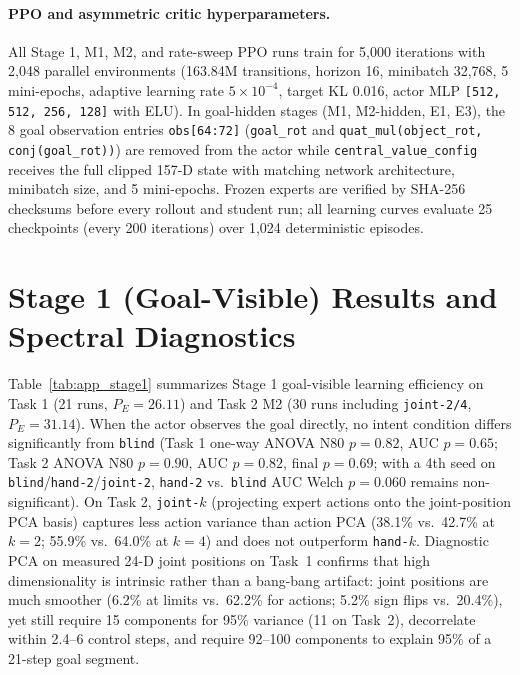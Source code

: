 \paragraph{PPO and asymmetric critic hyperparameters.}
All Stage 1, M1, M2, and rate-sweep PPO runs train for 5,000 iterations with 2,048 parallel environments (163.84M transitions, horizon 16, minibatch 32,768, 5 mini-epochs, adaptive learning rate $5\times 10^{-4}$, target KL 0.016, actor MLP \texttt{[512, 512, 256, 128]} with ELU).
In goal-hidden stages (M1, M2-hidden, E1, E3), the 8 goal observation entries \texttt{obs[64:72]} (\texttt{goal\_rot} and \texttt{quat\_mul(object\_rot, conj(goal\_rot))}) are removed from the actor while \texttt{central\_value\_config} receives the full clipped 157-D state with matching network architecture, minibatch size, and 5 mini-epochs.
Frozen experts are verified by SHA-256 checksums before every rollout and student run; all learning curves evaluate 25 checkpoints (every 200 iterations) over 1,024 deterministic episodes.

\section{Stage 1 (Goal-Visible) Results and Spectral Diagnostics}
\label{app:stage1}
Table~\ref{tab:app_stage1} summarizes Stage 1 goal-visible learning efficiency on Task 1 (21 runs, $P_E=26.11$) and Task 2 M2 (30 runs including \texttt{joint-2/4}, $P_E=31.14$).
When the actor observes the goal directly, no intent condition differs significantly from \texttt{blind} (Task 1 one-way ANOVA N80 $p=0.82$, AUC $p=0.65$; Task 2 ANOVA N80 $p=0.90$, AUC $p=0.82$, final $p=0.69$; with a 4th seed on \texttt{blind}/\texttt{hand-2}/\texttt{joint-2}, \texttt{hand-2} vs.\ \texttt{blind} AUC Welch $p=0.060$ remains non-significant).
On Task 2, \texttt{joint-$k$} (projecting expert actions onto the joint-position PCA basis) captures less action variance than action PCA (38.1\% vs.\ 42.7\% at $k=2$; 55.9\% vs.\ 64.0\% at $k=4$) and does not outperform \texttt{hand-$k$}.
Diagnostic PCA on measured 24-D joint positions on Task~1 confirms that high dimensionality is intrinsic rather than a bang-bang artifact: joint positions are much smoother (6.2\% at limits vs.\ 62.2\% for actions; 5.2\% sign flips vs.\ 20.4\%), yet still require 15 components for 95\% variance (11 on Task~2), decorrelate within 2.4--6 control steps, and require 92--100 components to explain 95\% of a 21-step goal segment.

